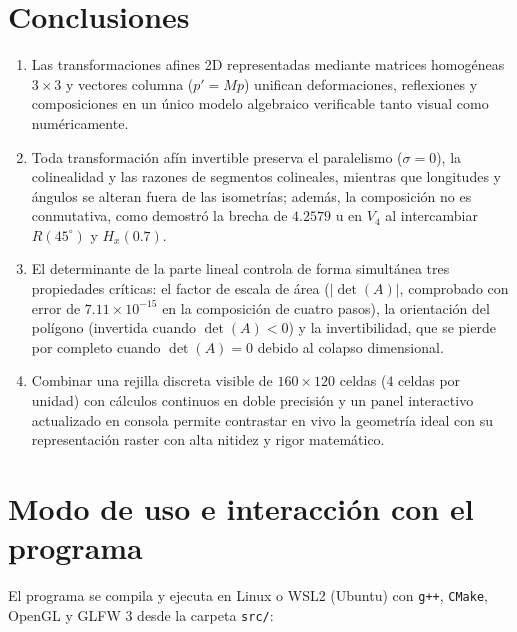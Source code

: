 \documentclass[a4paper,10pt]{article}
\begin{document}
\section{Conclusiones}

\begin{enumerate}
  \item Las transformaciones afines 2D representadas mediante matrices homogéneas $3\times 3$ y vectores columna ($p'=Mp$) unifican deformaciones, reflexiones y composiciones en un único modelo algebraico verificable tanto visual como numéricamente.
  \item Toda transformación afín invertible preserva el paralelismo ($\sigma = 0$), la colinealidad y las razones de segmentos colineales, mientras que longitudes y ángulos se alteran fuera de las isometrías; además, la composición no es conmutativa, como demostró la brecha de $4.2579\text{ u}$ en $V_4$ al intercambiar $R(45^\circ)$ y $H_x(0.7)$.
  \item El determinante de la parte lineal controla de forma simultánea tres propiedades críticas: el factor de escala de área ($|\det(A)|$, comprobado con error de $7.11\times 10^{-15}$ en la composición de cuatro pasos), la orientación del polígono (invertida cuando $\det(A) < 0$) y la invertibilidad, que se pierde por completo cuando $\det(A) = 0$ debido al colapso dimensional.
  \item Combinar una rejilla discreta visible de $160\times 120$ celdas ($4$ celdas por unidad) con cálculos continuos en doble precisión y un panel interactivo actualizado en consola permite contrastar en vivo la geometría ideal con su representación raster con alta nitidez y rigor matemático.
\end{enumerate}




\newpage
\appendix
\section{Modo de uso e interacción con el programa}

El programa se compila y ejecuta en Linux o WSL2 (Ubuntu) con \texttt{g++}, \texttt{CMake}, OpenGL y GLFW 3 desde la carpeta \texttt{src/}:
\end{document}
